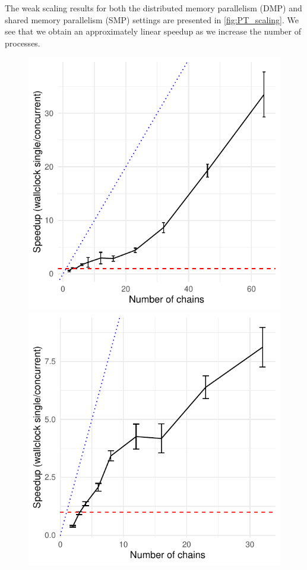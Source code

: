 \medskip
The weak scaling results for both the distributed memory parallelism (DMP) and 
shared memory parallelism (SMP) settings are presented in \cref{fig:PT_scaling}. 
We see that we obtain an approximately linear speedup as we increase the number of processes. 

\begin{figure}[t]
    \centering
    \begin{minipage}{0.4\textwidth}
      \centering
      \includegraphics[width=\textwidth]{../img/speedup_distributed.pdf}
    \end{minipage}
    \begin{minipage}{0.4\textwidth}
      \centering
      \includegraphics[width=\textwidth]{../img/speedup_parallel.pdf}

\end{minipage}
\end{figure}
